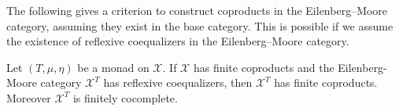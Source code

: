 The following gives a criterion to construct coproducts in the Eilenberg–Moore category, assuming they exist in the base category. This is possible if we assume the existence of reflexive coequalizers in the Eilenberg–Moore category.

\begin{mainbox}{}
    \begin{prop}\label{algebras category has colim if the base category has coprod}
        Let $(T,\mu,\eta)$ be a monad on $\mathcal{X}$. If $\mathcal{X}$ has finite coproducts and the Eilenberg-Moore category $\mathcal{X}^T$ has reflexive coequalizers, then $\mathcal{X}^T$ has finite coproducts. Moreover $\mathcal{X}^T$ is finitely cocomplete.
    \end{prop}
\end{mainbox}

